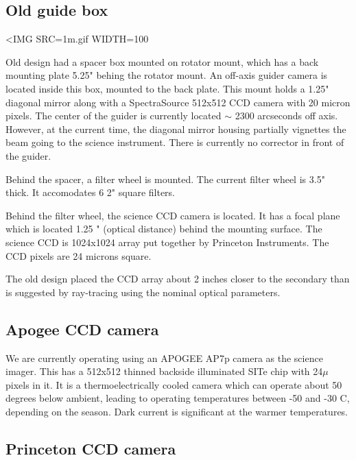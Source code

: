 \documentclass{article}[12pt]
\begin{document}
\subsection{Old guide box}

\begin{latexonly}
\end{latexonly}
\begin{htmlonly}
\begin{rawhtml}
<IMG SRC=1m.gif WIDTH=100%
\end{rawhtml}
\end{htmlonly}

Old design had a spacer box mounted on rotator mount, which has a
back mounting plate 5.25" behing the rotator mount. An off-axis guider
camera is located inside this box, mounted to the back plate.  This
mount holds a 1.25" diagonal mirror along with a SpectraSource 512x512
CCD camera with 20 micron pixels.  The center of the guider is currently
located $\sim$ 2300 arcseconds off axis.  However, at the current time,
the diagonal mirror housing partially vignettes the beam going to the
science instrument.  There is currently no corrector in front of the
guider.

Behind the spacer, a filter wheel is mounted. The current filter wheel
is 3.5" thick. It accomodates 6 2" square filters. 

Behind the filter wheel, the science CCD camera is located. It has a
focal plane which is located 1.25 " (optical distance) behind the
mounting surface. The science CCD is 1024x1024 array put together 
by Princeton Instruments. The CCD pixels are 24 microns square.

The old design placed the CCD array about 2 inches closer to the
secondary than is suggested by ray-tracing using the nominal optical
parameters.

\subsection{Apogee CCD camera}

We are currently operating using an APOGEE AP7p camera as the science
imager. This has a 512x512 thinned backside illuminated SITe chip  with
24$\mu$ pixels
in it. It is a thermoelectrically cooled camera which can operate about
50 degrees below ambient, leading to operating temperatures between
-50 and -30 C, depending on the season. Dark current is significant
at the warmer temperatures.

\subsection{Princeton CCD camera}
\end{document}
